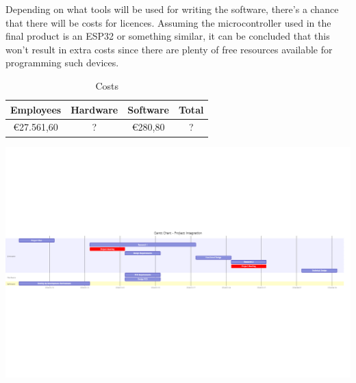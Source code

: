 \documentclass{article}
\begin{document}
Depending on what tools will be used for writing the software, there's a chance that there will be costs for licences.
Assuming the microcontroller used in the final product is an ESP32 or something similar, it can be concluded that this won't result in extra costs since there are plenty of free resources available for programming such devices.

\begin{table}[htbp]
\centering
\caption{Costs}
\begin{tabular}{c|c|c|c}
Employees & Hardware & Software & Total \\
\hline
\euro{}27.561,60 & ? & \euro{}280,80 & ? \\
\end{tabular}
\end{table}
\newpage

\begin{sideways}
\centering
\includegraphics[width=\paperheight]{images/gantt-chart.png}
\end{sideways}
\end{document}
